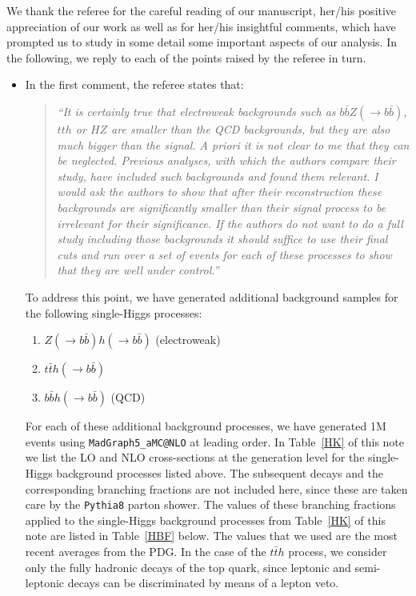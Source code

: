 \documentclass[11pt,a4paper]{article}
\begin{document}
We thank the referee for the careful reading of our manuscript,
her/his positive appreciation of our work as well as for
her/his insightful comments, which have prompted us to study
in some detail some important aspects of our analysis.
%
In the following, we reply to each of the points raised by the
referee in turn.

\begin{itemize}

\item In the first comment, the referee states that:

  \begin{quote}
    \it
``It is certainly true that electroweak backgrounds such as $b\bar{b}Z(\to b\bar{b})$, $tth$ or $HZ$ are smaller than the QCD backgrounds, but they are also much bigger than the signal. A priori it is not clear to me that they can be neglected. Previous analyses, with which the authors compare their study, have included such backgrounds and found them relevant. I would ask the authors to show that after their reconstruction these backgrounds are significantly smaller than their signal process to be irrelevant for their significance. If the authors do not want to do a full study including those backgrounds it should suffice to use their final cuts and run over a set of events for each of these processes to show that they are well under control.'' 
    \end{quote}

  To address this point, we have generated additional background samples for
  the following single-Higgs
  processes:
  \begin{enumerate}
  \item $Z(\to b\bar{b})h(\to b\bar{b})$ (electroweak)
  \item $t\bar{t}h(\to b\bar{b})$
    \item $b\bar{b}h(\to b\bar{b})$ (QCD)
  \end{enumerate}
  For each of these additional background processes, we have generated 1M events using
  {\tt MadGraph5\_aMC@NLO} at leading order.
  In Table~\ref{HK} of this note we list the
  LO and NLO cross-sections at the generation level for the single-Higgs background
  processes listed above.
  The subsequent decays and the corresponding branching fractions are not included here, since
  these are taken care by the {\tt Pythia8} parton shower.
  The values of these branching fractions applied to the single-Higgs
  background processes from Table~\ref{HK} of this note
  are listed in Table~\ref{HBF} below.
  The values that we used are the most recent averages from the PDG.
  In the case of the $t\bar{t}h$ process, we consider only the fully hadronic decays
  of the top quark, since leptonic and semi-leptonic decays can be discriminated
  by means of a lepton veto.
  

\end{itemize}
\end{document}
